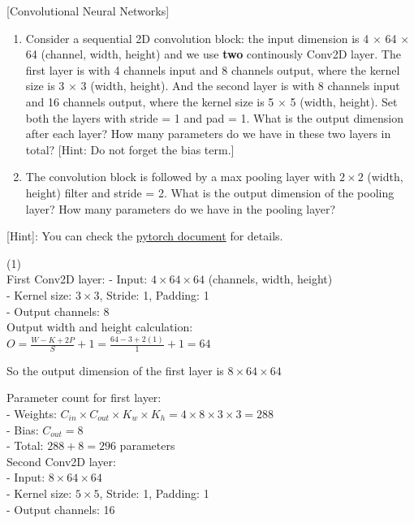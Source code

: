 \item {} [Convolutional Neural Networks]

\begin{enumerate}
    \item Consider a sequential 2D convolution block: the input dimension is 4 $\times$ 64 $\times$ 64 (channel, width, height) and we use \textbf{two} continously Conv2D layer. The first layer is with 4 channels input and 8 channels output, where the kernel size is 3 $\times$ 3 (width, height). And the second layer is with 8 channels input and 16 channels output, where the kernel size is 5 $\times$ 5 (width, height). Set both the layers with stride = 1 and pad = 1. What is the output dimension after each layer? How many parameters do we have in these two layers in total?  [Hint: Do not forget the bias term.]
    \item The convolution block is followed by a max pooling layer with $2\times 2$ (width, height) filter and stride
    = 2. What is the output dimension of the pooling layer? How many parameters do we have in the pooling
    layer? 
\end{enumerate}

[Hint]: You can check the \href{https://pytorch.org/docs/stable/nn.html#convolution-layers}{pytorch document} for details.

\solution

(1) \\

First Conv2D layer:
- Input: $4 \times 64 \times 64$ (channels, width, height)\\
- Kernel size: $3 \times 3$, Stride: 1, Padding: 1\\
- Output channels: 8\\

Output width and height calculation:\\
$O = \frac{W - K + 2P}{S} + 1 = \frac{64 - 3 + 2(1)}{1} + 1 = 64$

So the output dimension of the first layer is $8 \times 64 \times 64$

Parameter count for first layer:\\
- Weights: $C_{in} \times C_{out} \times K_w \times K_h = 4 \times 8 \times 3 \times 3 = 288$\\
- Bias: $C_{out} = 8$\\
- Total: $288 + 8 = 296$ parameters\\

Second Conv2D layer:\\
- Input: $8 \times 64 \times 64$\\
- Kernel size: $5 \times 5$, Stride: 1, Padding: 1\\
- Output channels: 16\\

